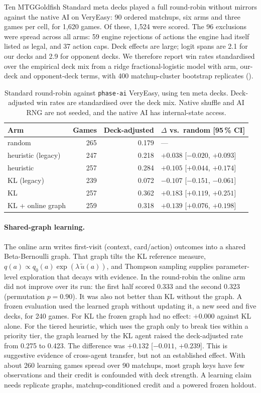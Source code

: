 \documentclass[11pt,a4paper]{article}
\theoremstyle{definition}
\theoremstyle{plain}
\begin{document}
Ten MTGGoldfish Standard meta decks played a full round-robin without
mirrors against the native AI on VeryEasy: 90 ordered matchups, six arms
and three games per cell, for 1,620 games. Of these, 1,524 were scored.
The 96 exclusions were spread across all arms: 59 engine rejections of
actions the engine had itself listed as legal, and 37 action caps. Deck
effects are large; logit spans are 2.1 for our decks and 2.9 for opponent
decks. We therefore report win rates standardised over the empirical deck
mix from a ridge fractional-logistic model with arm, our-deck and
opponent-deck terms, with 400 matchup-cluster bootstrap replicates
().

\begin{table}[ht]
\centering
\small
\begin{tabular}{lrrl}
\toprule
Arm & Games & Deck-adjusted & $\Delta$ vs.\ random [95\,\% CI] \\
\midrule
random & 265 & 0.179 & --- \\
heuristic (legacy) & 247 & 0.218 & $+0.038$ [$-0.020$, $+0.093$] \\
heuristic & 257 & 0.284 & $+0.105$ [$+0.044$, $+0.174$] \\
KL (legacy) & 239 & 0.072 & $-0.107$ [$-0.151$, $-0.061$] \\
KL & 257 & 0.362 & $+0.183$ [$+0.119$, $+0.251$] \\
KL + online graph & 259 & 0.318 & $+0.139$ [$+0.076$, $+0.198$] \\
\bottomrule
\end{tabular}
\caption{Standard round-robin against \texttt{phase-ai} VeryEasy, using ten
meta decks. Deck-adjusted win rates are standardised over the deck mix.
Native shuffle and AI RNG are not seeded, and the native AI has
internal-state access.}
\label{tab:standard-rr}
\end{table}

\paragraph{Shared-graph learning.}
The online arm writes first-visit (context, card/action) outcomes into a
shared Beta-Bernoulli graph. That graph tilts the KL reference measure,
$q(a)\propto q_0(a)\exp(\lambda\,\tilde u(a))$, and Thompson sampling
supplies parameter-level exploration that decays with evidence. In the
round-robin the online arm did not improve over its run: the first half
scored 0.333 and the second 0.323 (permutation $p=0.90$). It was also not
better than KL without the graph. A frozen evaluation used the learned
graph without updating it, a new seed and five decks, for 240 games. For
KL the frozen graph had no effect: $+0.000$ against KL alone. For the
tiered heuristic, which uses the graph only to break ties within a
priority tier, the graph learned by the KL agent raised the deck-adjusted
rate from 0.275 to 0.423. The difference was $+0.132$ [$-0.011$, $+0.239$].
This is suggestive evidence of cross-agent transfer, but not an
established effect. With about 260 learning games spread over 90 matchups,
most graph keys have few observations and their credit is confounded with
deck strength. A learning claim needs replicate graphs, matchup-conditioned
credit and a powered frozen holdout.
\end{document}

